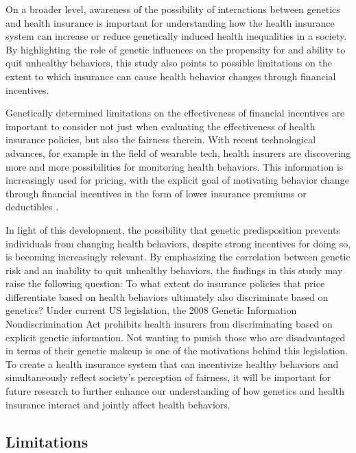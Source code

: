 \documentclass[11pt]{article}
\begin{document}
On a broader level, awareness of the possibility of interactions between genetics and health insurance is important for understanding how the health insurance system can increase or reduce genetically induced health inequalities in a society.
By highlighting the role of genetic influences on the propensity for and ability to quit unhealthy behaviors, this study also points to possible limitations on the extent to which insurance can cause health behavior changes through financial incentives.

Genetically determined limitations on the effectiveness of financial incentives are important to consider not just when evaluating the effectiveness of health insurance policies, but also the fairness therein.
With recent technological advances, for example in the field of wearable tech, health insurers are discovering more and more possibilities for monitoring health behaviors.
This information is increasingly used for pricing, with the explicit goal of motivating behavior change through financial incentives in the form of lower insurance premiums or deductibles \citep{Forbes2014,SwissRe2017}.


In light of this development, the possibility that genetic predisposition prevents individuals from changing health behaviors, despite strong incentives for doing so, is becoming increasingly relevant.
By emphasizing the correlation between genetic risk and an inability to quit unhealthy behaviors, the findings in this study may raise the following question: To what extent do insurance policies that price differentiate based on health behaviors ultimately also discriminate based on genetics? Under current US legislation, the 2008 Genetic Information Nondiscrimination Act prohibits health insurers from discriminating based on explicit genetic information.
Not wanting to punish those who are disadvantaged in terms of their genetic makeup is one of the motivations behind this legislation.
To create a health insurance system that can incentivize healthy behaviors and simultaneously reflect society's perception of fairness, it will be important for future research to further enhance our understanding of how genetics and health insurance interact and jointly affect health behaviors.

\vspace{5mm}


\subsection{Limitations}\label{sec:limitations}
\end{document}
